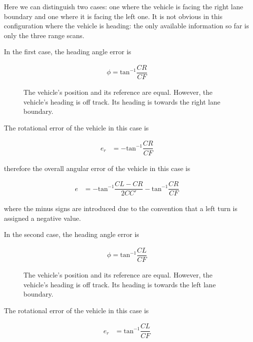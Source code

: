 Here we can distinguish two cases: one where the vehicle is facing the right
lane boundary and one where it is facing the left one. It is not obvious
in this configuration where the vehicle is heading: the only available
information so far is only the three range scans.

In the first case, the heading angle error is

\begin{align}
  \phi = \text{tan}^{-1}\dfrac{CR}{CF}
\end{align}

\begin{figure}[H]\centering
  \scalebox{1}{}
  \caption{The vehicle's position and its reference are equal. However,
    the vehicle's heading is off track. Its heading is towards the right
    lane boundary.}
  \label{}
\end{figure}

The rotational error of the vehicle in this case is

\begin{align}
  e_r &= -\text{tan}^{-1}\dfrac{CR}{CF}
\end{align}

therefore the overall angular error of the vehicle in this case is

\begin{align}
  e &= -\text{tan}^{-1}\dfrac{CL-CR}{2CC'} - \text{tan}^{-1}\dfrac{CR}{CF}
\end{align}

where the minus signs are introduced due to the
convention that a left turn is assigned a negative value.


In the second case, the heading angle error is

\begin{align}
  \phi = \text{tan}^{-1}\dfrac{CL}{CF}
\end{align}

\begin{figure}[H]\centering
  \scalebox{1}{}
  \caption{The vehicle's position and its reference are equal. However,
    the vehicle's heading is off track. Its heading is towards the left
    lane boundary.}
  \label{}
\end{figure}

The rotational error of the vehicle in this case is

\begin{align}
  e_r &= \text{tan}^{-1}\dfrac{CL}{CF}
\end{align}


